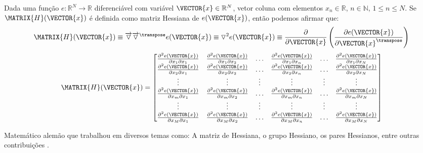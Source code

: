 \begin{proposition}\label{def:hessian}
 Dada uma função $e:\mathbb{R}^{N}\rightarrow \mathbb{R}$ diferenciável com variável $\VECTOR{x} \in \mathbb{R}^{N}$,
 vetor coluna  com elementos $x_n\in \mathbb{R}$, $n\in \mathbb{N}$, $1 \leq n \leq N$.
 Se $\MATRIX{H}(\VECTOR{x})$ é definida como matriz Hessiana \cite[pp. 150]{zhang2017matrix} \cite{Hessian} 
 de $e(\VECTOR{x})$, então podemos afirmar que: 
\begin{equation}
  \MATRIX{H}(\VECTOR{x}) \equiv  \overrightarrow{\triangledown} \overrightarrow{\triangledown}^{\transpose}e(\VECTOR{x}) \equiv  
\triangledown^2 e(\VECTOR{x}) \equiv \frac{\partial }{\partial \VECTOR{x}} \left( \frac{\partial e(\VECTOR{x})}{ \partial \VECTOR{x}^{\transpose} }\right) 
\end{equation}
 \begin{equation}
  \MATRIX{H}(\VECTOR{x}) =
\left[
\begin{matrix}
\frac{\partial^2 e(\VECTOR{x}) }{\partial x_{1}\partial x_{1}}&
\frac{\partial^2 e(\VECTOR{x}) }{\partial x_{1}\partial x_{2}}&
\hdots&
\frac{\partial^2 e(\VECTOR{x}) }{\partial x_{1}\partial x_{n}}&
\hdots&
\frac{\partial^2 e(\VECTOR{x}) }{\partial x_{1}\partial x_{N}}\\
\frac{\partial^2 e(\VECTOR{x}) }{\partial x_{2}\partial x_{1}}&
\frac{\partial^2 e(\VECTOR{x}) }{\partial x_{2}\partial x_{2}}&
\hdots&
\frac{\partial^2 e(\VECTOR{x}) }{\partial x_{2}\partial x_{n}}&
\hdots&
\frac{\partial^2 e(\VECTOR{x}) }{\partial x_{2}\partial x_{N}}\\
\vdots&
\vdots&
\vdots&
\vdots&
\vdots&
\vdots\\
\frac{\partial^2 e(\VECTOR{x}) }{\partial x_{m}\partial x_{1}}&
\frac{\partial^2 e(\VECTOR{x}) }{\partial x_{m}\partial x_{2}}&
\hdots&
\frac{\partial^2 e(\VECTOR{x}) }{\partial x_{m}\partial x_{n}}&
\hdots&
\frac{\partial^2 e(\VECTOR{x}) }{\partial x_{m}\partial x_{N}}\\
\vdots&
\vdots&
\vdots&
\vdots&
\vdots&
\vdots\\
\frac{\partial^2 e(\VECTOR{x}) }{\partial x_{M}\partial x_{1}}&
\frac{\partial^2 e(\VECTOR{x}) }{\partial x_{M}\partial x_{2}}&
\hdots&
\frac{\partial^2 e(\VECTOR{x}) }{\partial x_{M}\partial x_{n}}&
\hdots&
\frac{\partial^2 e(\VECTOR{x}) }{\partial x_{M}\partial x_{N}}\\
\end{matrix}
\right]
 \end{equation}
\end{proposition}



\begin{elaboracion}[title=Ludwig Otto Hesse (1811-1874), width= 0.99\linewidth]
Matemático alemão que trabalhou em diversos temas como: A matriz de Hessiana, 
o grupo Hessiano, os pares Hessianos, entre outras contribuições \cite[pp. 261]{agarwal2014creators}.
\end{elaboracion}
